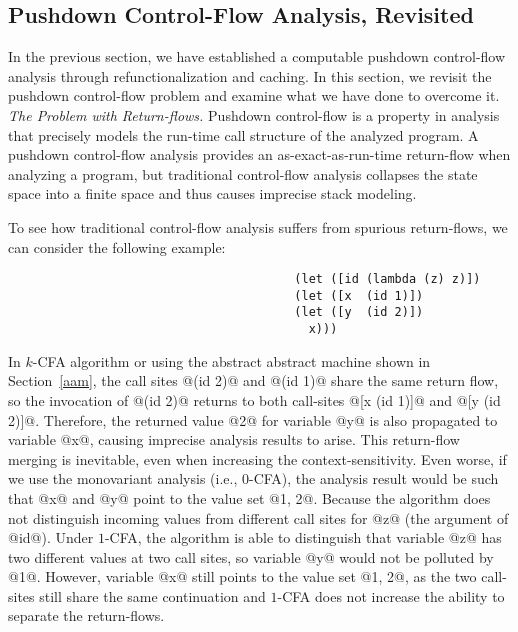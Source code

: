 \documentclass[acmsmall, review]{acmart}\settopmatter{}
\begin{document}
\subsection{Pushdown Control-Flow Analysis, Revisited} \label{pdcfarevisit}

In the previous section, we have established a computable pushdown control-flow
analysis through refunctionalization and caching. In this section, we revisit 
the pushdown control-flow problem and examine what we have done to overcome it. \\

\textit{The Problem with Return-flows.}
Pushdown control-flow is a property in analysis that precisely models the run-time
call structure of the analyzed program. A pushdown control-flow analysis provides an 
as-exact-as-run-time return-flow when analyzing a program, but traditional 
control-flow analysis collapses the state space into a finite space and thus 
causes imprecise stack modeling.

To see how traditional control-flow analysis suffers from spurious return-flows,
we can consider the following example:

\begin{lstlisting}
                                        (let ([id (lambda (z) z)])
                                        (let ([x  (id 1)])
                                        (let ([y  (id 2)])
                                          x)))
\end{lstlisting}

In $k$-CFA algorithm or using the abstract abstract machine shown in Section~\ref{aam},
the call sites @(id 2)@ and @(id 1)@ share the same return flow, so the invocation
of @(id 2)@ returns to both call-sites @[x (id 1)]@ and @[y (id 2)]@.  Therefore,
the returned value @2@ for variable @y@ is also propagated to variable @x@, causing
imprecise analysis results to arise. This return-flow merging is inevitable, even when
increasing the context-sensitivity. Even worse, if we use the monovariant analysis (i.e.,
$0$-CFA), the analysis result would be such that @x@ and @y@ point to the value set @{1, 2}@.
Because the algorithm does not distinguish incoming values from different call sites 
for @z@ (the argument of @id@). Under $1$-CFA, the algorithm is able to distinguish that variable
@z@ has two different values at two call sites, so variable @y@ would not be polluted by
@1@. However, variable @x@ still points to the value set @{1, 2}@, as the two call-sites 
still share the same continuation and $1$-CFA does not increase the ability to separate the 
return-flows. \\
\end{document}
